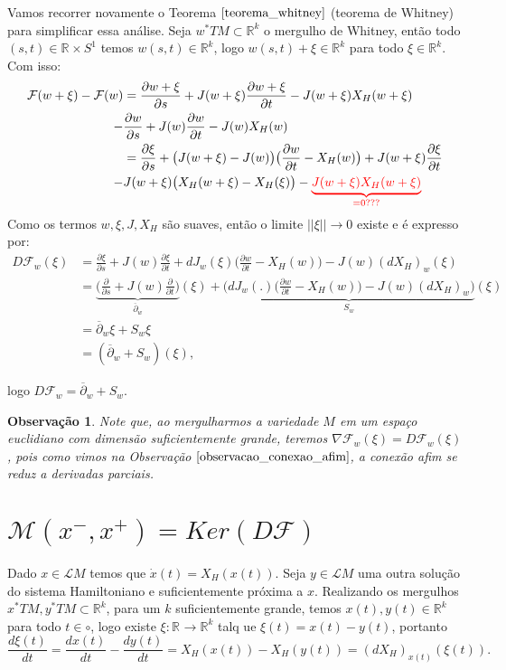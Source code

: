 \documentclass[12pt]{book}
\newtheorem{observacao}[teorema]{Observação}
\newcommand{\bigparenteses}[1]{\big( #1 \big) }
\newcommand{\campohamiltoniano}[1]{X_{H}(#1)}
\newcommand{\circulo}{S^{1}}
\newcommand{\derivada}[2]{\frac{d #1}{d #2}}
\newcommand{\derivadaparcial}[2]{\frac{\partial #1}{\partial #2}}
\newcommand{\diferencialhamiltoniano}[1]{(dX_{H})_{#1}}
\newcommand{\mapafloer}{\mathcal{F}}
\newcommand{\mapafloerdefinicao}[1]{\derivadaparcial{#1}{s} + J(#1)\derivadaparcial{#1}{t} - J(#1)X_{H}(#1)}
\newcommand{\mapafloerparametro}[1]{\mathcal{F}(#1)}
\newcommand{\norma}[1]{||#1||}
\newcommand{\operadorcauchyabrev}[1]{\overline{\partial}_{#1}}
\newcommand{\orbitasconectantespadrao}{\mathcal{M}(x^{-}, x^{+})}
\newcommand{\pullbackfibradotangente}[2]{#1^{*}T#2}
\newcommand{\pullbackfibradotangenteM}[1]{\pullbackfibradotangente{#1}{M}}
\newcommand{\retacartesianocirculo}{\real{} \times \circulo}
\newcommand{\real}[1]{\mathbb{R}^{#1}}
\newcommand{\solucoesperiodicascontrateis}{\mathcal{L}M}
\newcommand{\vermelho}[1]{{\color{red}#1}}
\begin{document}
	Vamos recorrer novamente o Teorema $\ref{teorema_whitney}$ (teorema de Whitney) para simplificar essa análise. Seja $\pullbackfibradotangenteM{w} \subset \real{k}$ o mergulho de Whitney, então todo $(s,t) \in \retacartesianocirculo$ temos $w(s,t) \in \real{k}$, logo  $ w(s,t)+\xi \in \real{k}$ para todo $\xi \in \real{k}$. Com isso:
	$$
	\begin{aligned}
		\mapafloerparametro{w+\xi}-\mapafloerparametro{w}
		&= \mapafloerdefinicao{w+\xi}
		\\
		 - & \mapafloerdefinicao{w}
		\\
		&=\derivadaparcial{\xi}{s} + \bigparenteses{J(w+\xi)-J(w)}\bigparenteses{\derivadaparcial{w}{t} - X_{H}(w)} + J(w+\xi)\derivadaparcial{\xi}{t} 
		\\
		- & J(w+\xi)\bigparenteses{X_{H}(w+\xi) - X_{H}(\xi)} - \vermelho{\underbrace{J(w+\xi)X_{H}(w+\xi)}_{=0???}}
	\end{aligned}
	$$
	Como os termos $w, \xi, J, X_{H}$ são suaves, então o limite $\norma{\xi} \to 0$ existe e é expresso por:
	$$
	\begin{aligned}
	D\mapafloer_{w}(\xi) 
	&= \derivadaparcial{\xi}{s} + J(w)\derivadaparcial{\xi}{t}+ dJ_{w}(\xi)\bigparenteses{\derivadaparcial{w}{t} - X_{H}(w)} - J(w) \diferencialhamiltoniano{w}(\xi)
	\\
	&= \underbrace{\Big( \derivadaparcial{}{s} + J(w)\derivadaparcial {}{t}\Big)}_{\overline{\partial}_{w}}(\xi)+ \underbrace{\Big(dJ_{w}(.)\bigparenteses{\derivadaparcial{w}{t} - X_{H}(w)} - J(w) \diferencialhamiltoniano{w}\Big)}_{S_{w}}(\xi)
	\\
	&= \operadorcauchyabrev{w} \xi + S_{w}\xi
	\\
	&= (\operadorcauchyabrev{w}  + S_{w})(\xi),
	\end{aligned}
	$$
	
	logo $ D\mapafloer_{w}= \operadorcauchyabrev{w}  + S_{w}$.
	
	\begin{observacao}
		Note que, ao mergulharmos a variedade $M$ em um espaço euclidiano com dimensão suficientemente grande, teremos $\nabla \mapafloer_{w}(\xi)=D\mapafloer_{w}(\xi)$, pois como vimos na Observação $\ref{observacao_conexao_afim}$, a conexão afim se reduz a derivadas parciais.
	\end{observacao}
	
	\section{$\orbitasconectantespadrao = Ker(D\mapafloer)$}
	Dado $x \in \solucoesperiodicascontrateis$ temos que $\dot{x}(t) = \campohamiltoniano{x(t)}$. Seja $y \in \solucoesperiodicascontrateis$ uma outra solução do sistema Hamiltoniano e suficientemente próxima a $x$. Realizando os mergulhos $\pullbackfibradotangenteM{x}, \pullbackfibradotangenteM{y} \subset \real{k}$, para um $k$ suficientemente grande, temos  $x(t), y(t) \in \real{k}$ para todo $t \in \circ$, logo existe $\xi:\real{}\to \real{k}$ talq ue $\xi(t)=x(t)-y(t)$, portanto
	$$
	\derivada{\xi(t)}{t} = \derivada{x(t)}{t} -\derivada{y(t)}{t} = \campohamiltoniano{x(t)} - \campohamiltoniano{y(t)} =\diferencialhamiltoniano{x(t)}(\xi(t)).
	$$
	
\end{document}
